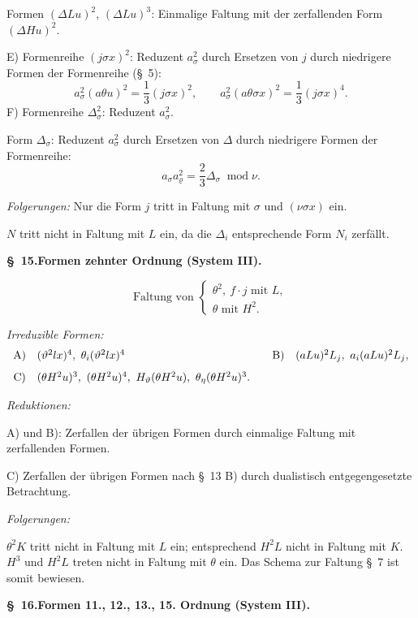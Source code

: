 \documentclass[11pt]{article}
\newcommand{\A}{\Delta}
\newcommand{\R}{\varrho}
\newcommand{\modu}[1]{\;\operatorname{mod} #1}
\providecommand{\modu}[1]{\;\operatorname{mod} #1}
\begin{document}
Formen $(\A Lu)^2$, $(\A Lu)^3$: Einmalige Faltung mit der zerfallenden Form $(\A Hu)^2$.

E) Formenreihe $(j\sigma x)^2$: Reduzent $a_\sigma^2$ durch Ersetzen von $j$ durch niedrigere Formen der Formenreihe (\S\ 5):
\[
a_\sigma^2(a\theta u)^2=\frac13(j\sigma x)^2,
\qquad
a_\sigma^2(a\theta\sigma x)^2=\frac13(j\sigma x)^4.
\]
F) Formenreihe $\A_\sigma^2$: Reduzent $a_\sigma^2$.

Form $\A_\sigma$: Reduzent $a_\sigma^2$ durch Ersetzen von $\A$ durch niedrigere Formen der Formenreihe:
\[
a_\sigma a_\R^2=\frac23\A_\sigma\modu{\nu}.
\]

\noindent\emph{Folgerungen:} Nur die Form $j$ tritt in Faltung mit $\sigma$ und $(\nu\sigma x)$ ein.

$N$ tritt nicht in Faltung mit $L$ ein, da die $\A_i$ entsprechende Form $N_i$ zerfällt.

\begin{center}
\textbf{\S\ 15.\quad Formen zehnter Ordnung (System III).}
\end{center}
\[
\text{Faltung von }\left\{\begin{array}{l}
\theta^2,
\ f\cdot j\text{ mit }L,\\
\theta\text{ mit }H^2.
\end{array}\right.
\]

\noindent\emph{Irreduzible Formen:}
\[
\begin{array}{c@{\quad}l@{\qquad}c@{\quad}l}
\text{A)}&(\vartheta^2lx)^4,
\ \theta_i(\vartheta^2lx)^4&
\text{B)}&(aLu)^2L_j,
\ a_i(aLu)^2L_j,\\[0.8em]
\text{C)}&(\theta H^2u)^3,
\ (\theta H^2u)^4,
\ H_\vartheta(\theta H^2u),
\ \theta_\eta(\theta H^2u)^3.
\end{array}
\]

\noindent\emph{Reduktionen:}

A) und B): Zerfallen der übrigen Formen durch einmalige Faltung mit zerfallenden Formen.

C) Zerfallen der übrigen Formen nach \S\ 13 B) durch dualistisch entgegengesetzte Betrachtung.

\noindent\emph{Folgerungen:}

$\theta^2K$ tritt nicht in Faltung mit $L$ ein; entsprechend $H^2L$ nicht in Faltung mit $K$. $H^3$ und $H^2L$ treten nicht in Faltung mit $\theta$ ein. Das Schema zur Faltung \S\ 7 ist somit bewiesen.

\begin{center}
\textbf{\S\ 16.\quad Formen 11., 12., 13., 15. Ordnung (System III).}
\end{center}
\end{document}
